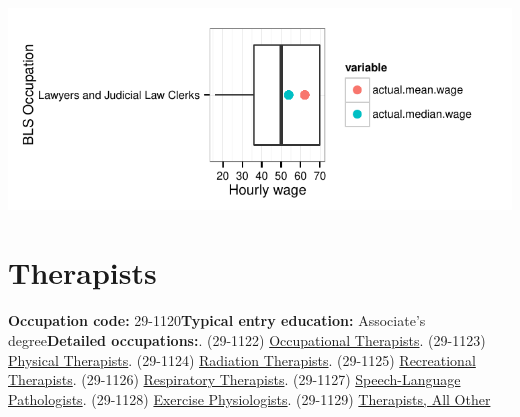 \documentclass[a4paper,10pt]{article}\usepackage[]{graphicx}\usepackage[]{color}
\makeatletter
\def\maxwidth{ %
  \ifdim\Gin@nat@width>\linewidth
    \linewidth
  \else
    \Gin@nat@width
  \fi
}
\makeatother
\begin{document}
{\centering \includegraphics[width=\maxwidth]{figure/unnamed-chunk-252} 

}


\newpage\section{Therapists}\textbf{Occupation code:} 29-1120\newline\textbf{Typical entry education:} Associate's degree\newline\textbf{Detailed occupations:}. (29-1122)  \href{http://www.bls.gov/oes/current/oes291122.htm}{Occupational Therapists}. (29-1123)  \href{http://www.bls.gov/oes/current/oes291123.htm}{Physical Therapists}. (29-1124)  \href{http://www.bls.gov/oes/current/oes291124.htm}{Radiation Therapists}. (29-1125)  \href{http://www.bls.gov/oes/current/oes291125.htm}{Recreational Therapists}. (29-1126)  \href{http://www.bls.gov/oes/current/oes291126.htm}{Respiratory Therapists}. (29-1127)  \href{http://www.bls.gov/oes/current/oes291127.htm}{Speech-Language Pathologists}. (29-1128)  \href{http://www.bls.gov/oes/current/oes291128.htm}{Exercise Physiologists}. (29-1129)  \href{http://www.bls.gov/oes/current/oes291129.htm}{Therapists, All Other}\newline%
\end{document}
